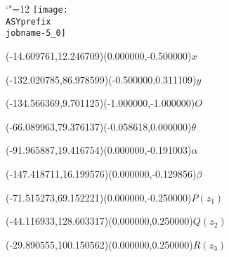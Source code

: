 \setlength{\unitlength}{1pt}%
\makeatletter%
\let\ASYencoding\f@encoding%
\let\ASYfamily\f@family%
\let\ASYseries\f@series%
\let\ASYshape\f@shape%
\makeatother%
{\catcode`"=12%
\texttt{[image: \\ASYprefix\\jobname-5\_0]}%
}%
%
\fontsize{12.000000}{14.400000}\selectfont%
\usefont{\ASYencoding}{\ASYfamily}{\ASYseries}{\ASYshape}%
\ASYalign(-14.609761,12.246709)(0.000000,-0.500000){$x$}%
%
\fontsize{12.000000}{14.400000}\selectfont%
\ASYalign(-132.020785,86.978599)(-0.500000,0.311109){$y$}%
%
\fontsize{12.000000}{14.400000}\selectfont%
\ASYalign(-134.566369,9.701125)(-1.000000,-1.000000){$O$}%
%
\fontsize{12.000000}{14.400000}\selectfont%
\ASYalign(-66.089963,79.376137)(-0.058618,0.000000){$\theta$}%
%
\fontsize{12.000000}{14.400000}\selectfont%
\ASYalign(-91.965887,19.416754)(0.000000,-0.191003){$\alpha$}%
%
\fontsize{12.000000}{14.400000}\selectfont%
\ASYalign(-147.418711,16.199576)(0.000000,-0.129856){$\beta$}%
%
\fontsize{12.000000}{14.400000}\selectfont%
\ASYalign(-71.515273,69.152221)(0.000000,-0.250000){$P(z_1)$}%
%
\fontsize{12.000000}{14.400000}\selectfont%
\ASYalign(-44.116933,128.603317)(0.000000,0.250000){$Q(z_2)$}%
%
\fontsize{12.000000}{14.400000}\selectfont%
\ASYalign(-29.890555,100.150562)(0.000000,0.250000){$R(z_3)$}%
